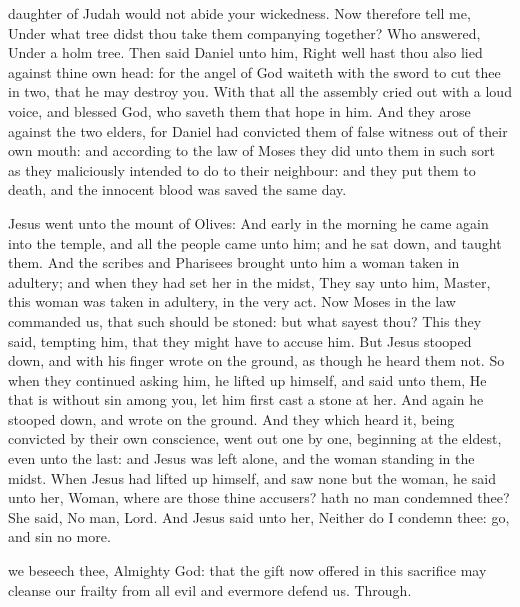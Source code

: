 daughter of Judah would not abide your wickedness. Now therefore tell me, Under what tree didst thou take them companying together? Who answered, Under a holm tree. Then said Daniel unto him, Right well hast thou also lied against thine own head: for the angel of God waiteth with the sword to cut thee in two, that he may destroy you. With that all the assembly cried out with a loud voice, and blessed God, who saveth them that hope in him. And they arose against the two elders, for Daniel had convicted them of false witness out of their own mouth: and according to the law of Moses they did unto them in such sort as they maliciously intended to do to their neighbour: and they put them to death, and the innocent blood was saved the same day.


 Jesus went unto the mount of Olives: And early in the morning he came again into the temple, and all the people came unto him; and he sat down, and taught them. And the scribes and Pharisees brought unto him a woman taken in adultery; and when they had set her in the midst, They say unto him, Master, this woman was taken in adultery, in the very act. Now Moses in the law commanded us, that such should be stoned: but what sayest thou? This they said, tempting him, that they might have to accuse him. But Jesus stooped down, and with his finger wrote on the ground, as though he heard them not. So when they continued asking him, he lifted up himself, and said unto them, He that is without sin among you, let him first cast a stone at her. And again he stooped down, and wrote on the ground. And they which heard it, being convicted by their own conscience, went out one by one, beginning at the eldest, even unto the last: and Jesus was left alone, and the woman standing in the midst. When Jesus had lifted up himself, and saw none but the woman, he said unto her, Woman, where are those thine accusers? hath no man condemned thee? She said, No man, Lord. And Jesus said unto her, Neither do I condemn thee: go, and sin no more.


\secret
{} we beseech thee, Almighty God: that the gift now offered in this sacrifice may cleanse our frailty from all evil and evermore defend us. Through.

